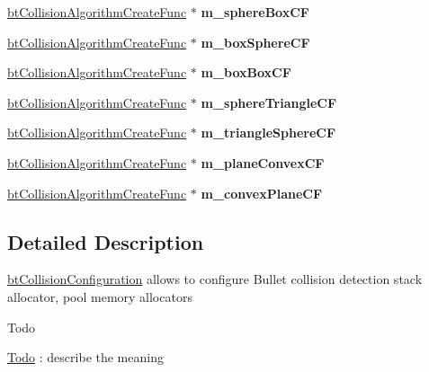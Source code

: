 \begin{DoxyCompactItemize}
\hyperlink{structbtCollisionAlgorithmCreateFunc}{bt\+Collision\+Algorithm\+Create\+Func} $\ast$ {\bfseries m\+\_\+sphere\+Box\+CF}
\item 
\mbox{\label{classbtDefaultCollisionConfiguration_a344fc04993fd3b023a6cea293fbb4d4b}} 
\hyperlink{structbtCollisionAlgorithmCreateFunc}{bt\+Collision\+Algorithm\+Create\+Func} $\ast$ {\bfseries m\+\_\+box\+Sphere\+CF}
\item 
\mbox{\label{classbtDefaultCollisionConfiguration_ac0fae9a0dffdbe1319421fdc9dfc852e}} 
\hyperlink{structbtCollisionAlgorithmCreateFunc}{bt\+Collision\+Algorithm\+Create\+Func} $\ast$ {\bfseries m\+\_\+box\+Box\+CF}
\item 
\mbox{\label{classbtDefaultCollisionConfiguration_a7d140fb4276d4d76956bcb2f090350bf}} 
\hyperlink{structbtCollisionAlgorithmCreateFunc}{bt\+Collision\+Algorithm\+Create\+Func} $\ast$ {\bfseries m\+\_\+sphere\+Triangle\+CF}
\item 
\mbox{\label{classbtDefaultCollisionConfiguration_a28b923c19d542cfe25db26781951931b}} 
\hyperlink{structbtCollisionAlgorithmCreateFunc}{bt\+Collision\+Algorithm\+Create\+Func} $\ast$ {\bfseries m\+\_\+triangle\+Sphere\+CF}
\item 
\mbox{\label{classbtDefaultCollisionConfiguration_af3286453cb3ffe5c5a891c0474fcb1e4}} 
\hyperlink{structbtCollisionAlgorithmCreateFunc}{bt\+Collision\+Algorithm\+Create\+Func} $\ast$ {\bfseries m\+\_\+plane\+Convex\+CF}
\item 
\mbox{\label{classbtDefaultCollisionConfiguration_a4c622cc0cfb299401b6ccb3996490649}} 
\hyperlink{structbtCollisionAlgorithmCreateFunc}{bt\+Collision\+Algorithm\+Create\+Func} $\ast$ {\bfseries m\+\_\+convex\+Plane\+CF}
\end{DoxyCompactItemize}


\subsection{Detailed Description}
\hyperlink{classbtCollisionConfiguration}{bt\+Collision\+Configuration} allows to configure Bullet collision detection stack allocator, pool memory allocators \begin{DoxyRefDesc}{Todo}
\item[\hyperlink{todo__todo000012}{Todo}]\+: describe the meaning \end{DoxyRefDesc}


